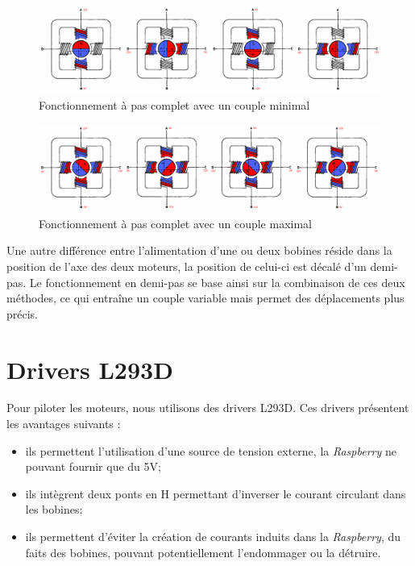 \documentclass[12pt,a4paper]{report}
\begin{document}
\begin{center}
\begin{figure}[!h]
 \center
 \includegraphics[scale=0.28]{../pictures/motor_min.png}
 \caption{Fonctionnement à pas complet avec un couple minimal\protect\footnotemark}
 \label{Motor_min}
\end{figure}

\begin{figure}[!h]
 \center
 \includegraphics[scale=0.28]{../pictures/motor_max.png}
 \caption{Fonctionnement à pas complet avec un couple maximal\protect\footnotemark}
 \label{Motor_max}
\end{figure}
\end{center}

Une autre différence entre l'alimentation d'une ou deux bobines réside dans la position de l'axe des deux moteurs, la position de celui-ci est décalé d'un demi-pas. Le fonctionnement en demi-pas se base ainsi sur la combinaison de ces deux méthodes, ce qui entraîne un couple variable mais permet des déplacements plus précis.

\section{Drivers L293D}
Pour piloter les moteurs, nous utilisons des drivers L293D. Ces drivers présentent les avantages suivants :
\begin{itemize}[label=--,itemsep=0pt,font=\bf\Large,labelsep=5mm]
\item ils permettent l'utilisation d'une source de tension externe, la \emph{Raspberry} ne pouvant fournir que du 5V;
\item ils intègrent deux ponts en H permettant d'inverser le courant circulant dans les bobines;
\item ils permettent d'éviter la création de courants induits dans la \emph{Raspberry}, du faits des bobines, pouvant potentiellement l'endommager ou la détruire.
\end{itemize}
\end{document}

